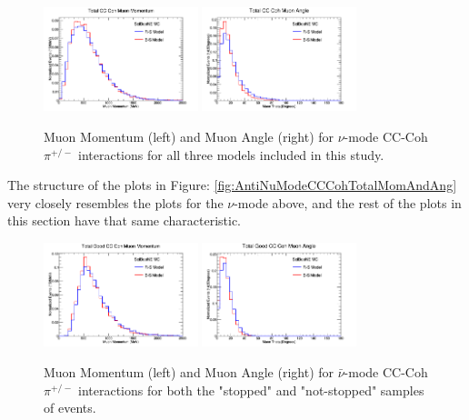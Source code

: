 \documentclass[11pt]{article}
\begin{document}
\begin{figure}[H]
\centering
\includegraphics[width=0.4\textwidth]{CCCohPlots/ANMCCCohTotalMomentum.png}
\includegraphics[width=0.4\textwidth]{CCCohPlots/ANMCCCohTotalAngle.png}
\caption{Muon Momentum (left) and Muon Angle (right) for $\nu$-mode CC-Coh $\pi^{+/-}$ interactions for all three models included in this study.}
\end{figure}\label{fig:AntiNuModeCCCohTotalMomAndAng}

The structure of the plots in Figure: \ref*{fig:AntiNuModeCCCohTotalMomAndAng} very closely resembles the plots for the $\nu$-mode above, and the rest of the plots in this section have that same characteristic.

\begin{figure}[H]
\centering
\includegraphics[width=0.4\textwidth]{CCCohPlots/ANMCCCohGoodMomentum.png}
\includegraphics[width=0.4\textwidth]{CCCohPlots/ANMCCCohGoodAngle.png}
\caption{Muon Momentum (left) and Muon Angle (right) for $\bar{\nu}$-mode CC-Coh $\pi^{+/-}$ interactions for both the "stopped" and "not-stopped" samples of events.}
\end{figure}\label{fig:AntiNuModeCCCohGoodMomAndAng}
\end{document}

